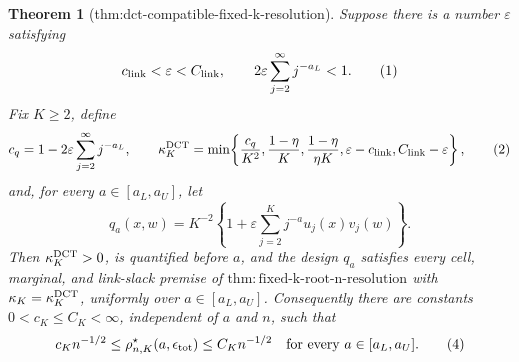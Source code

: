 \documentclass{article}
\newtheorem{theorem}{Theorem}
\begin{document}
\begin{theorem}[thm:dct-compatible-fixed-k-resolution]\label{thm:dct-compatible-fixed-k-resolution}
Suppose there is a number \(\varepsilon\) satisfying
\[
c_{\rm link}<\varepsilon<C_{\rm link},
\qquad
2\varepsilon\sum_{j=2}^{\infty}j^{-a_L}<1.
\tag{1}
\]
Fix \(K\ge2\), define
\[
c_q=1-2\varepsilon\sum_{j=2}^{\infty}j^{-a_L},
\qquad
\kappa_K^{\rm DCT}
=\min\!\left\{
\frac{c_q}{K^2},
\frac{1-\eta}{K},
\frac{1-\eta}{\eta K},
\varepsilon-c_{\rm link},
C_{\rm link}-\varepsilon
\right\},
\tag{2}
\]
and, for every \(a\in[a_L,a_U]\), let
\[
q_a(x,w)=K^{-2}\left\{1+\varepsilon\sum_{j=2}^Kj^{-a}u_j(x)v_j(w)\right\}.
\tag{3}
\]
Then \(\kappa_K^{\rm DCT}>0\), is quantified before \(a\), and the design \(q_a\) satisfies every cell, marginal, and link-slack premise of \(\mathrm{thm:fixed\mbox{-}k\mbox{-}root\mbox{-}n\mbox{-}resolution}\) with \(\kappa_K=\kappa_K^{\rm DCT}\), uniformly over \(a\in[a_L,a_U]\). Consequently there are constants \(0<c_K\le C_K<\infty\), independent of \(a\) and \(n\), such that
\[
c_Kn^{-1/2}
\le \rho^\star_{n,K}(a,\epsilon_{\rm tot})
\le C_Kn^{-1/2}
\quad\text{for every }a\in[a_L,a_U].
\tag{4}
\]
\end{theorem}
\end{document}
